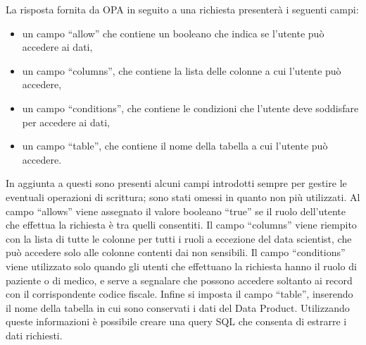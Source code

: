 \documentclass[a4paper,12pt]{report}
\begin{document}
La risposta fornita da OPA in seguito a una richiesta presenterà i seguenti campi:
\begin{itemize}
    \item un campo ``allow'' che contiene un booleano che indica se l'utente può accedere ai dati,
    \item un campo ``columns'', che contiene la lista delle colonne a cui l'utente può accedere,
    \item un campo ``conditions'', che contiene le condizioni che l'utente deve soddisfare per accedere ai dati,
    \item un campo ``table'', che contiene il nome della tabella a cui l'utente può accedere.
\end{itemize}
In aggiunta a questi sono presenti alcuni campi introdotti sempre per gestire le eventuali operazioni di scrittura; sono stati omessi in quanto non più utilizzati.  
Al campo ``allows'' viene assegnato il valore booleano ``true'' se il ruolo dell'utente che effettua la richiesta è tra quelli consentiti.
Il campo ``columns'' viene riempito con la lista di tutte le colonne per tutti i ruoli a eccezione del data scientist, che può accedere solo alle colonne contenti dai non sensibili.
Il campo ``conditions'' viene utilizzato solo quando gli utenti che effettuano la richiesta hanno il ruolo di paziente o di medico, e serve a segnalare che possono accedere soltanto ai record con il corrispondente codice fiscale.
Infine si imposta il campo ``table'', inserendo il nome della tabella in cui sono conservati i dati del Data Product.
Utilizzando queste informazioni è possibile creare una query SQL che consenta di estrarre i dati richiesti.
\end{document}
